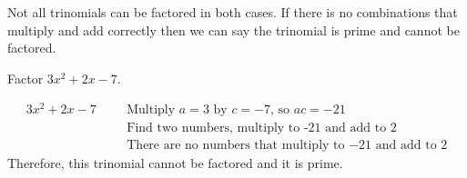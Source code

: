 \newpage
Not all trinomials can be factored in both cases. If there is no combinations that multiply and add correctly then we can say the trinomial is prime and cannot be factored.
\begin{exa}
    Factor $3x^2+2x-7$.
\end{exa}
\begin{align*}
    3x^2+2x-7& &   &\text{Multiply $a=3$ by $c=-7$, so $ac=-21$}\\
    &&&\text{Find two numbers, multiply to -21 and add to 2}\\
    &   &&\text{There are no numbers that multiply to $− 21$ and add to 2}
\end{align*}
Therefore, this trinomial cannot be factored and it is prime.
